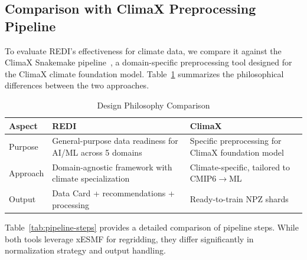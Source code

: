 


\subsection{Comparison with ClimaX Preprocessing Pipeline}

To evaluate REDI's effectiveness for climate data, we compare it against the ClimaX Snakemake pipeline~\cite{nguyen2023climax}, a domain-specific preprocessing tool designed for the ClimaX climate foundation model. Table~\ref{tab:philosophy} summarizes the philosophical differences between the two approaches.

\begin{table}[htbp]
\centering
\caption{Design Philosophy Comparison}
\label{tab:philosophy}
\begin{tabular}{@{}lp{1.4in}p{1.4in}@{}}
\toprule
\textbf{Aspect} & \textbf{REDI} & \textbf{ClimaX} \\
\midrule
Purpose & General-purpose data readiness for AI/ML across 5 domains & Specific preprocessing for ClimaX foundation model \\
\addlinespace
Approach & Domain-agnostic framework with climate specialization & Climate-specific, tailored to CMIP6$\rightarrow$ML \\
\addlinespace
Output & Data Card + recommendations + processing & Ready-to-train NPZ shards \\
\bottomrule
\end{tabular}
\end{table}

Table~\ref{tab:pipeline-steps} provides a detailed comparison of pipeline steps. While both tools leverage xESMF for regridding, they differ significantly in normalization strategy and output handling.

